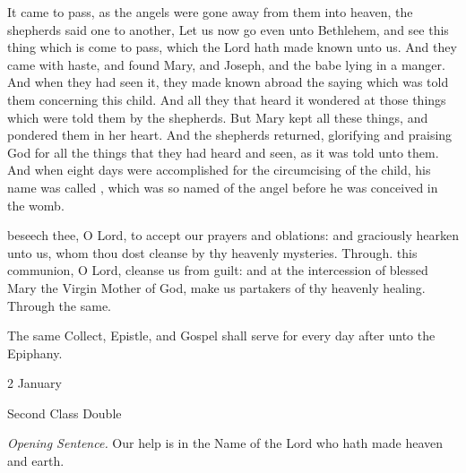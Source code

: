 

\vspace{-1ex}

 It came to pass, as the angels were gone away from them into heaven, the shepherds said one to another, Let us now go even unto Bethlehem, and see this thing which is come to pass, which the Lord hath made known unto us. And they came with haste, and found Mary, and Joseph, and the babe lying in a manger. And when they had seen it, they made known abroad the saying which was told them concerning this child. And all they that heard it wondered at those things which were told them by the shepherds. But Mary kept all these things, and pondered them in her heart. And the shepherds returned, glorifying and praising God for all the things that they had heard and seen, as it was told unto them. And when eight days were accomplished for the circumcising of the child, his name was called , which was so named of the angel before he was conceived in the womb.

\secret
{} beseech thee, O Lord, to accept our prayers and oblations: and graciously hearken unto us, whom thou dost cleanse by thy heavenly mysteries. Through.
\postcommunion
{} this communion, O Lord, cleanse us from guilt: and at the intercession of blessed Mary the Virgin Mother of God, make us partakers of thy heavenly healing. Through the same.

\begin{rubric}
    The same Collect, Epistle, and Gospel shall serve for every day after unto the Epiphany.
\end{rubric}

\label{MostHolyName}
\begin{inhead}
{2 January}\par
{Second Class Double}
\end{inhead}
\par\noindent
\textit{Opening Sentence.} Our help is in the Name of the Lord who hath made heaven and earth.

